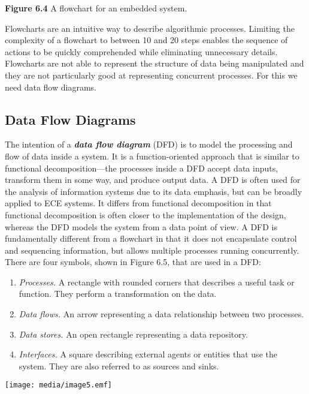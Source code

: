 \textbf{Figure 6.4} A flowchart for an embedded system.

Flowcharts are an intuitive way to describe algorithmic processes.
Limiting the complexity of a flowchart to between 10 and 20 steps
enables the sequence of actions to be quickly comprehended while
eliminating unnecessary details. Flowcharts are not able to represent
the structure of data being manipulated and they are not particularly
good at representing concurrent processes. For this we need data flow
diagrams.

\subsection{Data Flow Diagrams}\label{data-flow-diagrams}

The intention of a \emph{\textbf{data flow diagram}} (DFD) is to model
the processing and flow of data inside a system. It is a
function-oriented approach that is similar to functional
decomposition---the processes inside a DFD accept data inputs, transform
them in some way, and produce output data. A DFD is often used for the
analysis of information systems due to its data emphasis, but can be
broadly applied to ECE systems. It differs from functional decomposition
in that functional decomposition is often closer to the implementation
of the design, whereas the DFD models the system from a data point of
view. A DFD is fundamentally different from a flowchart in that it does
not encapsulate control and sequencing information, but allows multiple
processes running concurrently. There are four symbols, shown in Figure
6.5, that are used in a DFD:

\begin{enumerate}
\def\labelenumi{\arabic{enumi}.}
\item
  \emph{Processes.} A rectangle with rounded corners that describes a
  useful task or function. They perform a transformation on the data.
\item
  \emph{Data flows.} An arrow representing a data relationship between
  two processes.
\item
  \emph{Data stores.} An open rectangle representing a data repository.
\item
  \emph{Interfaces.} A square describing external agents or entities
  that use the system. They are also referred to as sources and sinks.
\end{enumerate}

\texttt{[image: media/image5.emf]}


